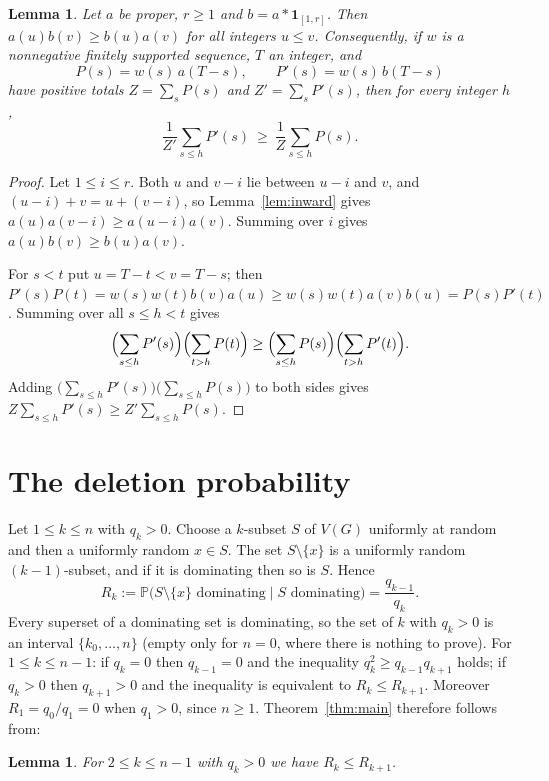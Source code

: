 \documentclass[11pt,a4paper]{amsart}
\newtheorem{lemma}[theorem]{Lemma}
\theoremstyle{definition}
\theoremstyle{remark}
\newcommand{\one}{\mathbf 1}
\newcommand{\Prob}{\mathbb P}
\begin{document}
\begin{lemma}\label{lem:compare}
Let $a$ be proper, $r\ge 1$ and $b=a*\one_{[1,r]}$. Then $a(u)b(v)\ge b(u)a(v)$ for all integers $u\le v$. Consequently, if $w$ is a nonnegative finitely supported sequence, $T$ an integer, and
\[
P(s)=w(s)\,a(T-s),\qquad P'(s)=w(s)\,b(T-s)
\]
have positive totals $Z=\sum_sP(s)$ and $Z'=\sum_sP'(s)$, then for every integer $h$,
\[
\frac1{Z'}\sum_{s\le h}P'(s)\ \ge\ \frac1Z\sum_{s\le h}P(s).
\]
\end{lemma}

\begin{proof}
Let $1\le i\le r$. Both $u$ and $v-i$ lie between $u-i$ and $v$, and $(u-i)+v=u+(v-i)$, so Lemma~\ref{lem:inward} gives $a(u)a(v-i)\ge a(u-i)a(v)$. Summing over $i$ gives $a(u)b(v)\ge b(u)a(v)$.

For $s<t$ put $u=T-t<v=T-s$; then $P'(s)P(t)=w(s)w(t)b(v)a(u)\ge w(s)w(t)a(v)b(u)=P(s)P'(t)$. Summing over all $s\le h<t$ gives
\[
\Bigl(\sum_{s\le h}P'(s)\Bigr)\Bigl(\sum_{t>h}P(t)\Bigr)\ge\Bigl(\sum_{s\le h}P(s)\Bigr)\Bigl(\sum_{t>h}P'(t)\Bigr).
\]
Adding $\bigl(\sum_{s\le h}P'(s)\bigr)\bigl(\sum_{s\le h}P(s)\bigr)$ to both sides gives $Z\sum_{s\le h}P'(s)\ge Z'\sum_{s\le h}P(s)$.
\end{proof}

\section{The deletion probability}

Let $1\le k\le n$ with $q_k>0$. Choose a $k$-subset $S$ of $V(G)$ uniformly at random and then a uniformly random $x\in S$. The set $S\setminus\{x\}$ is a uniformly random $(k-1)$-subset, and if it is dominating then so is $S$. Hence
\[
R_k:=\Prob\bigl(S\setminus\{x\}\text{ dominating}\mid S\text{ dominating}\bigr)=\frac{q_{k-1}}{q_k}.
\]
Every superset of a dominating set is dominating, so the set of $k$ with $q_k>0$ is an interval $\{k_0,\dots,n\}$ (empty only for $n=0$, where there is nothing to prove). For $1\le k\le n-1$: if $q_k=0$ then $q_{k-1}=0$ and the inequality $q_k^2\ge q_{k-1}q_{k+1}$ holds; if $q_k>0$ then $q_{k+1}>0$ and the inequality is equivalent to $R_k\le R_{k+1}$. Moreover $R_1=q_0/q_1=0$ when $q_1>0$, since $n\ge 1$. Theorem~\ref{thm:main} therefore follows from:

\begin{lemma}\label{lem:reduce}
For $2\le k\le n-1$ with $q_k>0$ we have $R_k\le R_{k+1}$.
\end{lemma}
\end{document}
